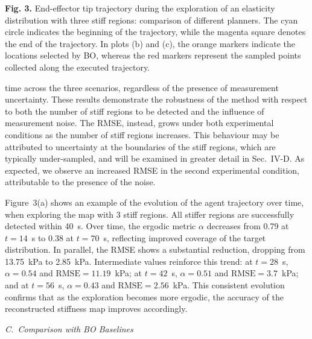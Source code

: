 \documentclass[11pt]{article}
\begin{document}
\begin{center}
\textbf{Fig. 3.} End-effector tip trajectory during the exploration
of an elasticity distribution with three stiff regions: comparison
of different planners. The cyan circle indicates the beginning of
the trajectory, while the magenta square denotes the end of the
trajectory. In plots (b) and (c), the orange markers indicate the
locations selected by BO, whereas the red markers represent the
sampled points collected along the executed trajectory.
\end{center}

\vspace{1em}

\noindent
time across the three scenarios, regardless of the presence of
measurement uncertainty. These results demonstrate the robustness of
the method with respect to both the number of stiff regions to be
detected and the influence of measurement noise. The RMSE, instead,
grows under both experimental conditions as the number of stiff
regions increases. This behaviour may be attributed to uncertainty
at the boundaries of the stiff regions, which are typically
under-sampled, and will be examined in greater detail in Sec.~IV-D.
As expected, we observe an increased RMSE in the second experimental
condition, attributable to the presence of the noise.

Figure~3(a) shows an example of the evolution of the agent
trajectory over time, when exploring the map with 3 stiff regions.
All stiffer regions are successfully detected within 40~s. Over
time, the ergodic metric $\alpha$ decreases from 0.79 at $t = 14$~s
to 0.38 at $t = 70$~s, reflecting improved coverage of the target
distribution. In parallel, the RMSE shows a substantial reduction,
dropping from 13.75~kPa to 2.85~kPa. Intermediate values reinforce
this trend: at $t = 28$~s, $\alpha = 0.54$ and
$\mathrm{RMSE} = 11.19$~kPa; at $t = 42$~s, $\alpha = 0.51$ and
$\mathrm{RMSE} = 3.7$~kPa; and at $t = 56$~s, $\alpha = 0.43$ and
$\mathrm{RMSE} = 2.56$~kPa. This consistent evolution confirms that
as the exploration becomes more ergodic, the accuracy of the
reconstructed stiffness map improves accordingly.

\vspace{0.6em}

\noindent\textit{C.~Comparison with BO Baselines}

\vspace{0.2em}
\end{document}
